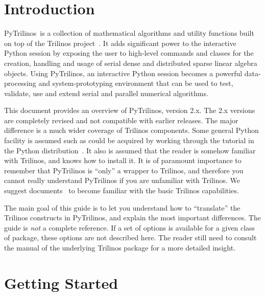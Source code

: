 \documentclass[10pt,relax]{SANDreport}
\newcommand{\PyTrilinos}{{PyTrilinos}}
\begin{document}
\section{Introduction}
\label{chap:introduction}

\PyTrilinos\ is a collection of mathematical algorithms and utility functions
built on top of the Trilinos project~\cite{Trilinos-home-page}.  It adds
significant power to the interactive Python session by exposing the user to
high-level commands and classes for the creation, handling and usage of serial
dense and distributed sparse linear algebra objects. Using \PyTrilinos, an
interactive Python session becomes a powerful data-processing and
system-prototyping environment that can be used to test, validate, use and
extend serial and parallel numerical algorithms.

\smallskip

This document provides an overview of \PyTrilinos, version 2.x.  The 2.x
versions are completely revised and not compatible with earlier releases. The
major difference is a much wider coverage of Trilinos components. Some general
Python facility is assumed such as could be acquired by working through the
tutorial in the Python distribution~\cite{python-tutorial}.  It also is
assumed that the reader is somehow familiar with Trilinos, and knows how to
install it.  It is of paramount importance to remember that PyTrilinos is
``only'' a wrapper to Trilinos, and therefore you cannot really understand
PyTrilinos if you are unfamiliar with Trilinos.  We suggest
documents~\cite{Trilinos-tutorial} to become familiar with the basic Trilinos
capabilities.

The main goal of this guide is to let you understand how to ``translate'' the
Trilinos constructs in PyTrilinos, and explain the most important differences.
The guide is {\sl not} a complete reference. If a set of options is available
for a given class of package, these options are not described here. The reader
still need to consult the manual of the underlying Trilinos package for a more
detailed insight.


\section{Getting Started}
\label{chap:started}
\end{document}
